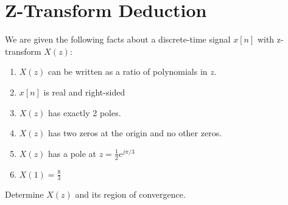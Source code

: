 \documentclass[11pt]{article}
\begin{document}
\section{Z-Transform Deduction}
We are given the following facts about a discrete-time signal $x[n]$ with z-transform $X(z)$:
\begin{enumerate}
	\item $X(z)$ can be written as a ratio of polynomials in $z$.
	\item $x[n]$ is real and right-sided
	\item $X(z)$ has exactly 2 poles.
	\item $X(z)$ has two zeros at the origin and no other zeros.
	\item $X(z)$ has a pole at $z=\frac{1}{2}e^{j \pi /3}$
	\item $X(1)=\frac{8}{3}$
\end{enumerate}
Determine $X(z)$ and its region of convergence.  

%
%
%
%
%
%
%
%
%
%
%
%
%
\end{document}
